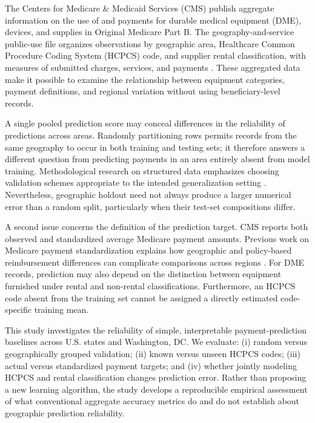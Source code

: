 The Centers for Medicare \& Medicaid Services (CMS) publish aggregate information on the use of and payments for durable medical equipment (DME), devices, and supplies in Original Medicare Part B. The geography-and-service public-use file organizes observations by geographic area, Healthcare Common Procedure Coding System (HCPCS) code, and supplier rental classification, with measures of submitted charges, services, and payments \citep{cmsdme2023}. These aggregated data make it possible to examine the relationship between equipment categories, payment definitions, and regional variation without using beneficiary-level records.

A single pooled prediction score may conceal differences in the reliability of predictions across areas. Randomly partitioning rows permits records from the same geography to occur in both training and testing sets; it therefore answers a different question from predicting payments in an area entirely absent from model training. Methodological research on structured data emphasizes choosing validation schemes appropriate to the intended generalization setting \citep{roberts2017}. Nevertheless, geographic holdout need not always produce a larger numerical error than a random split, particularly when their test-set compositions differ.

A second issue concerns the definition of the prediction target. CMS reports both observed and standardized average Medicare payment amounts. Previous work on Medicare payment standardization explains how geographic and policy-based reimbursement differences can complicate comparisons across regions \citep{odonnell2013}. For DME records, prediction may also depend on the distinction between equipment furnished under rental and non-rental classifications. Furthermore, an HCPCS code absent from the training set cannot be assigned a directly estimated code-specific training mean.

This study investigates the reliability of simple, interpretable payment-prediction baselines across U.S. states and Washington, DC. We evaluate: (i) random versus geographically grouped validation; (ii) known versus unseen HCPCS codes; (iii) actual versus standardized payment targets; and (iv) whether jointly modeling HCPCS and rental classification changes prediction error. Rather than proposing a new learning algorithm, the study develops a reproducible empirical assessment of what conventional aggregate accuracy metrics do and do not establish about geographic prediction reliability.
